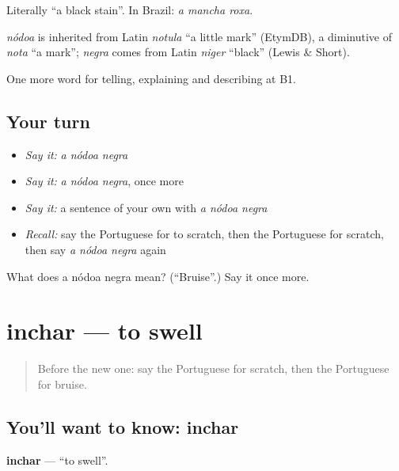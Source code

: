 Literally \textquotedblleft{}a black stain\textquotedblright{}. In Brazil: \emph{a mancha roxa}.

\begin{cousinweb}
\emph{nódoa} is inherited from Latin \emph{notula} \textquotedblleft{}a little mark\textquotedblright{} (EtymDB), a diminutive of \emph{nota} \textquotedblleft{}a mark\textquotedblright{}; \emph{negra} comes from Latin \emph{niger} \textquotedblleft{}black\textquotedblright{} (Lewis \& Short).
\end{cousinweb}

\begin{grammarlens}[title={What you've built}]
One more word for telling, explaining and describing at B1.
\end{grammarlens}

\subsection*{Your turn}
\begin{itemize}
\raggedright
  \item \emph{Say it:} \emph{a nódoa negra}
  \item \emph{Say it:} \emph{a nódoa negra}, once more
  \item \emph{Say it:} a sentence of your own with \emph{a nódoa negra}
  \item \emph{Recall:} say the Portuguese for to scratch, then the Portuguese for scratch, then say \emph{a nódoa negra} again
\end{itemize}

\begin{tcolorbox}[breakable,colback=teal!4,colframe=teal!35!black,title={Before you move on}]
What does a nódoa negra mean? (\textquotedblleft{}Bruise\textquotedblright{}.) Say it once more.
\end{tcolorbox}
\section[inchar]{inchar — to swell}

\label{lesson:PT-C485-inchar}



\begin{quote}
Before the new one: say the Portuguese for scratch, then the Portuguese for bruise.
\end{quote}

\subsection*{You'll want to know: inchar}
\textbf{inchar} — \textquotedblleft{}to swell\textquotedblright{}.


